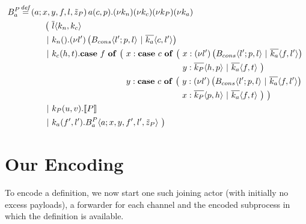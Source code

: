\begin{align*}
  \adef*{B_a^P}{a}{x,y,f,l,\tilde{z}_P}{\arcv{a}{c,p} . \anew{k_n}{\anew{k_c}{\anew{k_P}{\anew{k_a}{
    \\
    &\hspace{1cm}
    \begin{aligned}[t]
      \big(\ &\asnd{l}{k_n,k_c}
      \\
      \apar  &\arcv{k_n}{} . \anew{l'}{\parens{\ains{B_{cons}}{l'}{p, l} \apar \asnd{k_a}{c, l'}}}
      \\
      \apar  &\arcv{k_c}{h,t} .
        \begin{aligned}[t]
          \acse*{f}{\big(\ 
            &\aalt{x}{
              \begin{aligned}[t]
                \acse*{c}{\big(\ 
                  &\aalt{x}{\anew*{l'}{
                    \ains{B_{cons}}{l'}{p,l} \apar \asnd{k_a}{f,l'}
                  }}\\
                  &\aalt{y}{
                    \asnd{k_P}{h,p} \apar \asnd{k_a}{f,t}
                  }\ 
                \big)}
              \end{aligned}
            }\\
            &\aalt{y}{
              \begin{aligned}[t]
                \acse*{c}{\big(\ 
                  &\aalt{y}{\anew*{l'}{
                    \ains{B_{cons}}{l'}{p,l} \apar \asnd{k_a}{f,l'}
                  }}\\
                  &\aalt{x}{
                    \asnd{k_P}{p,h} \apar \asnd{k_a}{f,t}
                  }\ 
                \big)}
                \ \big)
              \end{aligned}
            }\ 
          }
        \end{aligned}
      \\
      \apar  &\arcv{k_P}{u,v} . \encMJtoAP{P}
      \\
      \apar  &\arcv{k_a}{f',l'} . \ains{B_a^P}{a}{x, y, f', l',\tilde{z}_P}
      \ \big)
    \end{aligned}
  }}}}} \\
\end{align*}

\section{Our Encoding}

To encode a \joincalc definition,
we now start one such joining actor (with initially no excess payloads),
a forwarder for each channel
and the encoded subprocess in which the definition is available.

